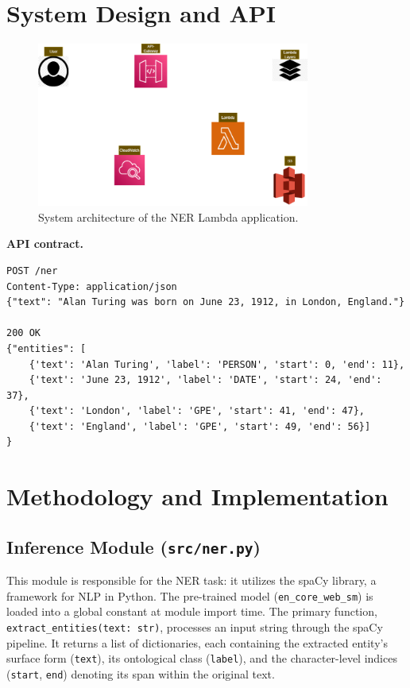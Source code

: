 \documentclass[11pt,a4paper]{article}
\begin{document}
\section{System Design and API}

\begin{figure}[H]
    \centering
    \includegraphics[width=0.8\textwidth]{figures/architecture_diagram.png}
    \caption{System architecture of the NER Lambda application.}
    \label{fig:architecture}
\end{figure}

\noindent\textbf{API contract.}
\begin{verbatim}
POST /ner
Content-Type: application/json
{"text": "Alan Turing was born on June 23, 1912, in London, England."}

200 OK
{"entities": [
    {'text': 'Alan Turing', 'label': 'PERSON', 'start': 0, 'end': 11},
    {'text': 'June 23, 1912', 'label': 'DATE', 'start': 24, 'end': 37},
    {'text': 'London', 'label': 'GPE', 'start': 41, 'end': 47},
    {'text': 'England', 'label': 'GPE', 'start': 49, 'end': 56}]
}
\end{verbatim}


\section{Methodology and Implementation}

\subsection{Inference Module (\texttt{src/ner.py})}
This module is responsible for the NER task: it utilizes the spaCy library, a framework for NLP in Python. The pre-trained model (\texttt{en\_core\_web\_sm}) is loaded into a global constant at module import time. The primary function, \texttt{extract\_entities(text: str)}, processes an input string through the spaCy pipeline. It returns a list of dictionaries, each containing the extracted entity's surface form (\texttt{text}), its ontological class (\texttt{label}), and the character-level indices (\texttt{start}, \texttt{end}) denoting its span within the original text.
\end{document}
